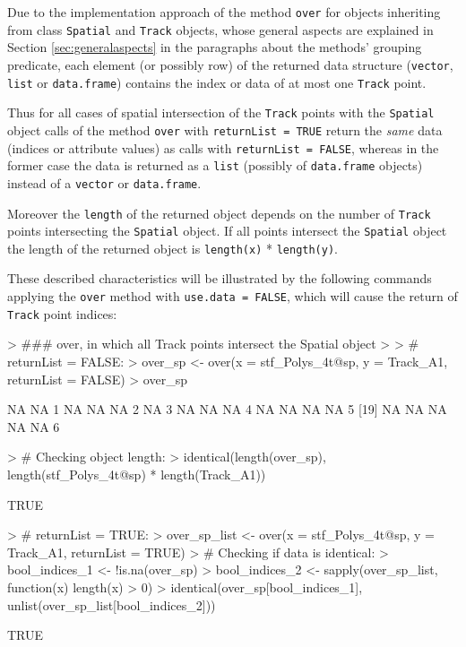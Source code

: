 \documentclass[12pt, oneside, a4paper]{scrbook}
\let\code=\texttt
\begin{document}
Due to the implementation approach of the method \code{over} for objects inheriting from class \code{Spatial} and \code{Track} objects, whose general aspects are explained in Section \ref{sec:generalaspects} in the paragraphs about the methods' grouping predicate, each element (or possibly row) of the returned data structure (\code{vector}, \code{list} or \code{data.frame}) contains the index or data of at most one \code{Track} point.
\par\medskip
Thus for all cases of spatial intersection of the \code{Track} points with the \code{Spatial} object calls of the method \code{over} with \code{returnList = TRUE} return the \textit{same} data (indices or attribute values) as calls with \code{returnList = FALSE}, whereas in the former case the data is returned as a \code{list} (possibly of \code{data.frame} objects) instead of a \code{vector} or \code{data.frame}.
\par\medskip
Moreover the \code{length} of the returned object depends on the number of \code{Track} points intersecting the \code{Spatial} object. If all points intersect the \code{Spatial} object the length of the returned object is \code{length(x)} * \code{length(y)}.
\par\medskip
These described characteristics will be illustrated by the following commands applying the \code{over} method with \code{use.data = FALSE}, which will cause the return of \code{Track} point indices:

\begin{small}
\begin{Schunk}
\begin{Sinput}
> ### over, in which all Track points intersect the Spatial object
> 
> # returnList = FALSE:
> over_sp <- over(x = stf_Polys_4t@sp, y = Track_A1, returnList = FALSE)
> over_sp
\end{Sinput}
\begin{Soutput}
 [1] NA NA  1 NA NA NA  2 NA  3 NA NA NA  4 NA NA NA NA  5
[19] NA NA NA NA NA  6
\end{Soutput}
\begin{Sinput}
> # Checking object length:
> identical(length(over_sp), length(stf_Polys_4t@sp) * length(Track_A1))
\end{Sinput}
\begin{Soutput}
[1] TRUE
\end{Soutput}
\begin{Sinput}
> # returnList = TRUE:
> over_sp_list <- over(x = stf_Polys_4t@sp, y = Track_A1, returnList = TRUE)
> # Checking if data is identical:
> bool_indices_1 <- !is.na(over_sp)
> bool_indices_2 <- sapply(over_sp_list, function(x) length(x) > 0)
> identical(over_sp[bool_indices_1], unlist(over_sp_list[bool_indices_2]))
\end{Sinput}
\begin{Soutput}
[1] TRUE
\end{Soutput}
\end{Schunk}
\end{small}
\end{document}
